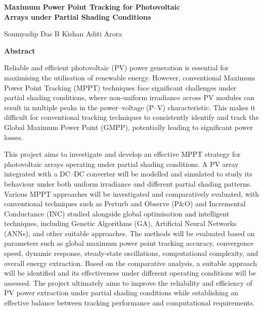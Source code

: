 \documentclass[10pt,a4paper]{article}
\begin{document}
\begin{center}
{\LARGE\bfseries Maximum Power Point Tracking for Photovoltaic\\[0.3em]
Arrays under Partial Shading Conditions\par}

\vspace{1em}
Soumyadip Das \quad B Kishan \quad Aditi Arora
\end{center}

\vspace{1.5em}

\begin{center}
{\large\bfseries Abstract}
\end{center}

\noindent
Reliable and efficient photovoltaic (PV) power generation is essential for
maximising the utilisation of renewable energy. However, conventional Maximum
Power Point Tracking (MPPT) techniques face significant challenges under
partial shading conditions, where non-uniform irradiance across PV modules
can result in multiple peaks in the power--voltage (P--V) characteristic.
This makes it difficult for conventional tracking techniques to consistently
identify and track the Global Maximum Power Point (GMPP), potentially leading
to significant power losses.

This project aims to investigate and develop an effective MPPT strategy for
photovoltaic arrays operating under partial shading conditions. A PV array
integrated with a DC--DC converter will be modelled and simulated to study its
behaviour under both uniform irradiance and different partial shading patterns.
Various MPPT approaches will be investigated and comparatively evaluated, with
conventional techniques such as Perturb and Observe (P\&O) and Incremental
Conductance (INC) studied alongside global optimisation and intelligent
techniques, including Genetic Algorithms (GA), Artificial Neural Networks
(ANNs), and other suitable approaches. The methods will be evaluated based on
parameters such as global maximum power point tracking accuracy, convergence
speed, dynamic response, steady-state oscillations, computational complexity,
and overall energy extraction. Based on the comparative analysis, a suitable
approach will be identified and its effectiveness under different operating
conditions will be assessed. The project ultimately aims to improve the
reliability and efficiency of PV power extraction under partial shading
conditions while establishing an effective balance between tracking performance
and computational requirements.
\end{document}
